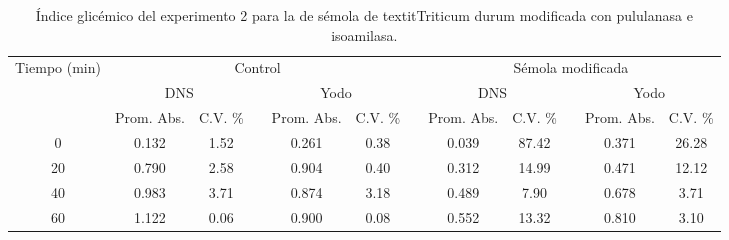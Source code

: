 \documentclass{article}
\begin{document}
\begin{table}[H]
	\centering
	\caption{Índice glicémico del experimento 2 para la de sémola de textit{Triticum durum} modificada con pululanasa e isoamilasa.}
		\begin{adjustbox}{width=\textwidth}
	\begin{tabular}{cccccccccccc}
		\toprule
		\multicolumn{1}{c}{\multirow{3}[6]{*}{Tiempo (min)}} & \multicolumn{5}{c}{Control}           &       & \multicolumn{5}{c}{Sémola modificada} \\
		\cmidrule{2-6}\cmidrule{8-12}          & \multicolumn{2}{c}{DNS} &       & \multicolumn{2}{c}{Yodo} &       & \multicolumn{2}{c}{DNS} &       & \multicolumn{2}{c}{Yodo} \\
		\cmidrule{2-3}\cmidrule{5-6}\cmidrule{8-9}\cmidrule{11-12}          & Prom. Abs. & C.V. \% &       & Prom. Abs. & C.V. \% &       & Prom. Abs. & C.V. \% &       & Prom. Abs. & C.V. \% \\
		\midrule
		0     & 0.132 & 1.52  &       & 0.261 & 0.38  &       & 0.039 & 87.42 &       & 0.371 & 26.28 \\
		20    & 0.790 & 2.58  &       & 0.904 & 0.40  &       & 0.312 & 14.99 &       & 0.471 & 12.12 \\
		40    & 0.983 & 3.71  &       & 0.874 & 3.18  &       & 0.489 & 7.90  &       & 0.678 & 3.71 \\
		60    & 1.122 & 0.06  &       & 0.900 & 0.08  &       & 0.552 & 13.32 &       & 0.810 & 3.10 \\
		\bottomrule
	\end{tabular}%
	\end{adjustbox}
	\label{tab:e2.3}%
\end{table}%
\end{document}
